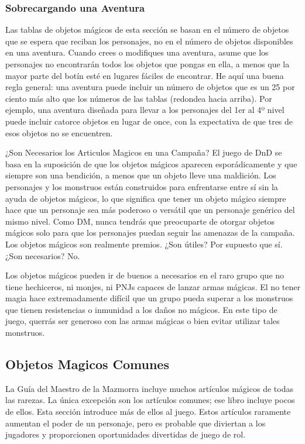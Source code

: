 \documentclass[a4paper,twocolumn,openany,10pt]{dndbook}
\begin{document}
\subsubsection*{Sobrecargando una Aventura}
Las tablas de objetos mágicos de esta sección se basan en el número de objetos que se espera que reciban los personajes, no en
el número de objetos disponibles en una aventura. Cuando crees o modifiques una aventura, asume que los personajes no
encontrarán todos los objetos que pongas en ella, a menos que la mayor parte del botín esté en lugares fáciles de encontrar. He
aquí una buena regla general: una aventura puede incluir un número de objetos que es un 25 por ciento más alto que los números
de las tablas (redondea hacia arriba). Por ejemplo, una aventura diseñada para llevar a los personajes del 1er al 4º nivel puede
incluir catorce objetos en lugar de once, con la expectativa de que tres de esos objetos no se encuentren. 

\begin{paperbox}[float=!b]{¿Son Necesarios los Articulos Magicos en una Campaña?}
	El juego de DnD se basa en la suposición de que los objetos mágicos aparecen esporádicamente y que siempre son una bendición,
	a menos que un objeto lleve una maldición. Los personajes y los monstruos están construidos para enfrentarse entre sí sin la
	ayuda de objetos mágicos, lo que significa que tener un objeto mágico siempre hace que un personaje sea más poderoso o
	versátil que un personaje genérico del mismo nivel. Como DM, nunca tendrás que preocuparte de otorgar objetos mágicos solo
	para que los personajes puedan seguir las amenazas de la campaña. Los objetos mágicos son realmente premios. ¿Son útiles?
	Por supuesto que sí. ¿Son necesarios? No.
	
	Los objetos mágicos pueden ir de buenos a necesarios en el raro grupo que no tiene hechiceros, ni monjes, ni PNJs capaces de
	lanzar armas mágicas. El no tener magia hace extremadamente difícil que un grupo pueda superar a los monstruos que tienen
	resistencias o inmunidad a los daños no mágicos. En este tipo de juego, querrás ser generoso con las armas mágicas o bien
	evitar utilizar tales monstruos. 
\end{paperbox}

\subsection{Objetos Magicos Comunes}
La Guía del Maestro de la Mazmorra incluye muchos artículos mágicos de todas las rarezas. La única excepción son los artículos
comunes; ese libro incluye pocos de ellos. Esta sección introduce más de ellos al juego. Estos artículos raramente aumentan el
poder de un personaje, pero es probable que diviertan a los jugadores y proporcionen oportunidades divertidas de juego de rol.
\end{document}
